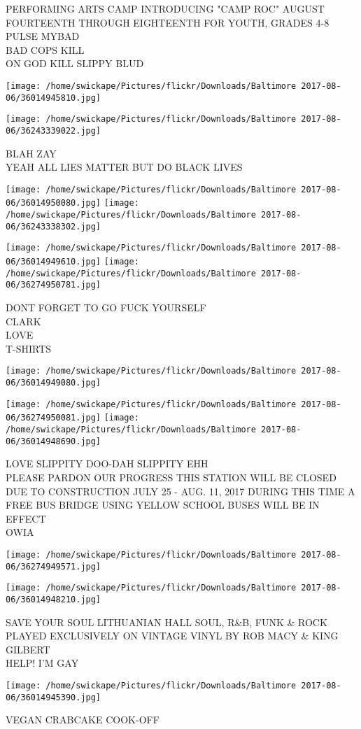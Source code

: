 \documentclass[10pt,letterpaper]{article}
\begin{document}
PERFORMING ARTS CAMP INTRODUCING "CAMP ROC" AUGUST FOURTEENTH THROUGH EIGHTEENTH FOR YOUTH, GRADES 4{-}8\\
PULSE MYBAD\\
BAD COPS KILL\\
ON GOD KILL SLIPPY BLUD
\pagebreak

\texttt{[image: /home/swickape/Pictures/flickr/Downloads/Baltimore 2017-08-06/36014945810.jpg]}

\vspace{0.25in}
\texttt{[image: /home/swickape/Pictures/flickr/Downloads/Baltimore 2017-08-06/36243339022.jpg]}

BLAH ZAY\\
YEAH ALL LIES MATTER BUT DO BLACK LIVES
\pagebreak

\texttt{[image: /home/swickape/Pictures/flickr/Downloads/Baltimore 2017-08-06/36014950080.jpg]}
\texttt{[image: /home/swickape/Pictures/flickr/Downloads/Baltimore 2017-08-06/36243338302.jpg]}

\texttt{[image: /home/swickape/Pictures/flickr/Downloads/Baltimore 2017-08-06/36014949610.jpg]}
\texttt{[image: /home/swickape/Pictures/flickr/Downloads/Baltimore 2017-08-06/36274950781.jpg]}

DONT FORGET TO GO FUCK YOURSELF\\
CLARK\\
LOVE\\
T{-}SHIRTS
\pagebreak

\texttt{[image: /home/swickape/Pictures/flickr/Downloads/Baltimore 2017-08-06/36014949080.jpg]}

\vspace{0.25in}
\texttt{[image: /home/swickape/Pictures/flickr/Downloads/Baltimore 2017-08-06/36274950081.jpg]}
\texttt{[image: /home/swickape/Pictures/flickr/Downloads/Baltimore 2017-08-06/36014948690.jpg]}

LOVE SLIPPITY DOO{-}DAH SLIPPITY EHH\\
PLEASE PARDON OUR PROGRESS THIS STATION WILL BE CLOSED DUE TO CONSTRUCTION JULY 25 {-} AUG. 11, 2017 DURING THIS TIME A FREE BUS BRIDGE USING YELLOW SCHOOL BUSES WILL BE IN EFFECT\\
OWIA
\pagebreak

\texttt{[image: /home/swickape/Pictures/flickr/Downloads/Baltimore 2017-08-06/36274949571.jpg]}

\vspace{0.25in}
\texttt{[image: /home/swickape/Pictures/flickr/Downloads/Baltimore 2017-08-06/36014948210.jpg]}

SAVE YOUR SOUL LITHUANIAN HALL SOUL, R\&B, FUNK \& ROCK PLAYED EXCLUSIVELY ON VINTAGE VINYL BY ROB MACY \& KING GILBERT\\
HELP!  I'M GAY
\pagebreak

\texttt{[image: /home/swickape/Pictures/flickr/Downloads/Baltimore 2017-08-06/36014945390.jpg]}

VEGAN CRABCAKE COOK{-}OFF
\pagebreak
\end{document}
